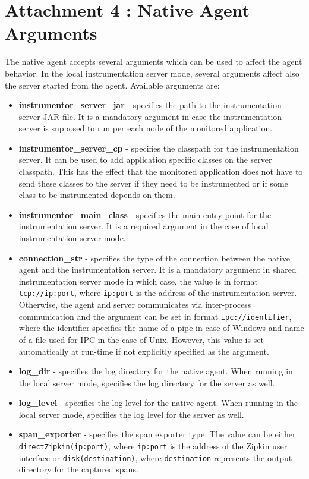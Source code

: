 \chapter*{Attachment 4 : Native Agent Arguments}
The native agent accepts several arguments which can be used to affect the agent behavior. In the local instrumentation server mode, several arguments affect also the server started from the agent. Available arguments are:
\begin{itemize}
	\item \textbf{instrumentor\_server\_jar} - specifies the path to the instrumentation server JAR file. It is a mandatory argument in case the instrumentation server is supposed to run per each node of the monitored application.
	\item \textbf{instrumentor\_server\_cp} - specifies the classpath for the instrumentation server. It can be used to add application specific classes on the server classpath. This has the effect that the monitored application does not have to send these classes to the server if they need to be instrumented or if some class to be instrumented depends on them.
	\item \textbf{instrumentor\_main\_class} - specifies the main entry point for the instrumentation server. It is a required argument in the case of local instrumentation server mode.
	\item \textbf{connection\_str} - specifies the type of the connection between the native agent and the instrumentation server. It is a mandatory argument in shared instrumentation server mode in which case, the value is in format \texttt{tcp://ip:port}, where \texttt{ip:port} is the address of the instrumentation server. Otherwise, the agent and server communicates via inter-process communication and the argument can be set in format \texttt{ipc://identifier}, where the identifier specifies the name of a pipe in case of Windows and name of a file used for IPC in the case of Unix. However, this value is set automatically at run-time if not explicitly specified as the argument.
	\item \textbf{log\_dir} - specifies the log directory for the native agent. When running in the local server mode, specifies the log directory for the server as well.
	\item \textbf{log\_level} - specifies the log level for the native agent. When running in the local server mode, specifies the log level for the server as well.
	\item \textbf{span\_exporter} - specifies the span exporter type. The value can be either \linebreak \texttt{directZipkin(ip:port)}, where \texttt{ip:port} is the address of the Zipkin user interface or \texttt{disk(destination)}, where \texttt{destination} represents the output directory for the captured spans. 
	

\end{itemize}
